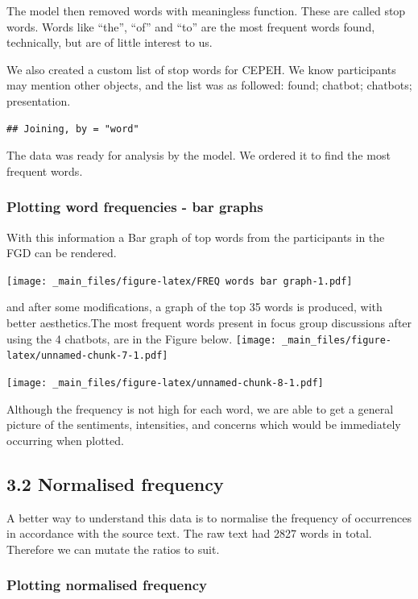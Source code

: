 \documentclass[a4paper, nobind]{templates/ociamthesis}
\begin{document}
The model then removed words with meaningless function. These are called stop words. Words like ``the'', ``of'' and ``to'' are the most frequent words found, technically, but are of little interest to us.

We also created a custom list of stop words for CEPEH. We know participants may mention other objects, and the list was as followed: found; chatbot; chatbots; presentation.

\begin{verbatim}
## Joining, by = "word"
\end{verbatim}

The data was ready for analysis by the model. We ordered it to find the most frequent words.

\hypertarget{plotting-word-frequencies---bar-graphs}{%
\subsubsection{Plotting word frequencies - bar graphs}\label{plotting-word-frequencies---bar-graphs}}

With this information a Bar graph of top words from the participants in the FGD can be rendered.

\texttt{[image: \_main\_files/figure-latex/FREQ words bar graph-1.pdf]}

and after some modifications, a graph of the top 35 words is produced, with better aesthetics.The most frequent words present in focus group discussions after using the 4 chatbots, are in the Figure below.
\texttt{[image: \_main\_files/figure-latex/unnamed-chunk-7-1.pdf]}

\texttt{[image: \_main\_files/figure-latex/unnamed-chunk-8-1.pdf]}

Although the frequency is not high for each word, we are able to get a general picture of the sentiments, intensities, and concerns which would be immediately occurring when plotted.

\hypertarget{normalised-frequency}{%
\subsection{3.2 Normalised frequency}\label{normalised-frequency}}

A better way to understand this data is to normalise the frequency of occurrences in accordance with the source text. The raw text had 2827 words in total. Therefore we can mutate the ratios to suit.

\hypertarget{plotting-normalised-frequency}{%
\subsubsection{Plotting normalised frequency}\label{plotting-normalised-frequency}}
\end{document}
